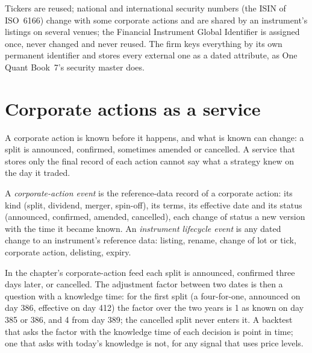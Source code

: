 \begin{remark}\label{rem:pl:reference-data-and-symbology-services:keys}
Tickers are reused; national and international security numbers (the ISIN of ISO~6166) change with some corporate actions and
are shared by an instrument's listings on several venues; the Financial Instrument Global Identifier is assigned once, never
changed and never reused. The firm keys everything by its own permanent identifier and stores every external one as a dated
attribute, as One Quant Book~7's security master does.
\end{remark}

\section{Corporate actions as a service}

A corporate action is known before it happens, and what is known can change: a split is announced, confirmed, sometimes amended
or cancelled. A service that stores only the final record of each action cannot say what a strategy knew on the day it traded.

\begin{definition}\label{def:pl:reference-data-and-symbology-services:event}
A \emph{corporate-action event} is the reference-data record of a corporate action: its kind
(split, dividend, merger, spin-off), its terms, its effective date and its status (announced, confirmed, amended, cancelled), each
change of status a new version with the time it became known. An \emph{instrument lifecycle event}
is any dated change to an instrument's reference data: listing, rename, change of lot or tick, corporate action, delisting,
expiry.
\end{definition}

\label{lst:pl:reference-data-and-symbology-services:actions}

In the chapter's corporate-action feed each split is announced, confirmed three days later, or cancelled. The adjustment factor
between two dates is then a question with a knowledge time: for the first split (a four-for-one, announced on day 386, effective
on day 412) the factor over the two years is 1 as known on day 385 or 386, and 4 from day 389; the cancelled split never enters
it. A backtest that asks the factor with the knowledge time of each decision is point in time; one that asks with today's
knowledge is not, for any signal that uses price levels.

